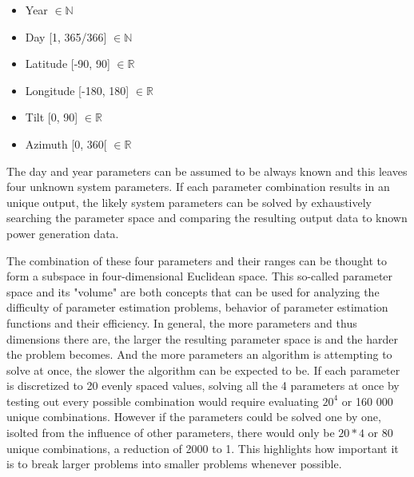 \begin{itemize}
	\item Year $\in \mathbb{N}$
	\item Day [1, 365/366] $\in \mathbb{N}$
	\item Latitude [-90, 90] $\in \mathbb{R}$%
	\item Longitude [-180, 180]  $\in \mathbb{R}$%
  	\item Tilt [0, 90] $\in \mathbb{R}$
  	\item Azimuth [0, 360[ $\in \mathbb{R}$
\end{itemize}


\vspace{3mm}
\noindent
The day and year parameters can be assumed to be always known and this leaves four unknown system parameters. If each parameter combination results in an unique output, the likely system parameters can be solved by exhaustively searching the parameter space and comparing the resulting output data to known power generation data.

The combination of these four parameters and their ranges can be thought to form a subspace in four-dimensional Euclidean space. This so-called parameter space and its "volume" are both concepts that can be used for analyzing the difficulty of parameter estimation problems, behavior of parameter estimation functions and their efficiency. In general, the more parameters and thus dimensions there are, the larger the resulting parameter space is and the harder the problem becomes. And the more parameters an algorithm is attempting to solve at once, the slower the algorithm can be expected to be. If each parameter is discretized to 20 evenly spaced values, solving all the 4 parameters at once by testing out every possible combination would require evaluating $20^4$ or 160 000 unique combinations. However if the parameters could be solved one by one, isolted from the influence of other parameters, there would only be $20*4$ or 80 unique combinations, a reduction of 2000 to 1. This highlights how important it is to break larger problems into smaller problems whenever possible.



